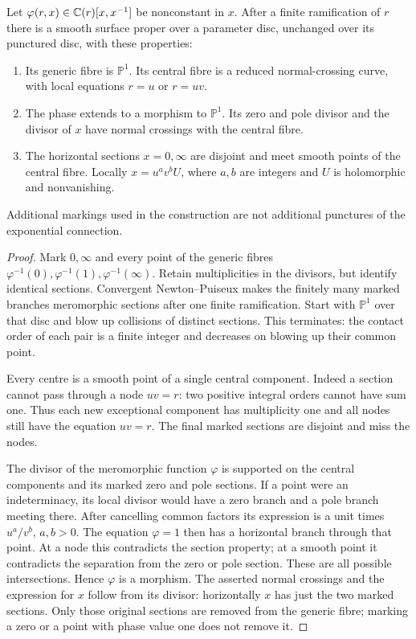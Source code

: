 \begin{lemma}\label{lem:markedmodel}
Let $\varphi(r,x)\in\mathbb C(r)[x,x^{-1}]$ be nonconstant in $x$.
After a finite ramification of $r$ there is a smooth surface proper
over a parameter disc, unchanged over its punctured disc, with these
properties:
\begin{enumerate}
\item Its generic fibre is $\mathbb P^1$. Its central fibre is a
reduced normal-crossing curve, with local equations $r=u$ or $r=uv$.
\item The phase extends to a morphism to $\mathbb P^1$. Its zero
and pole divisor and the divisor of $x$ have normal crossings with
the central fibre.
\item The horizontal sections $x=0,\infty$ are disjoint and meet
smooth points of the central fibre. Locally $x=u^a v^b U$, where
$a,b$ are integers and $U$ is holomorphic and nonvanishing.
\end{enumerate}
Additional markings used in the construction are not additional
punctures of the exponential connection.
\end{lemma}
\begin{proof}
Mark $0,\infty$ and every point of the generic fibres
$\varphi^{-1}(0),\varphi^{-1}(1),\varphi^{-1}(\infty)$.
Retain multiplicities in the divisors, but identify identical sections.
Convergent Newton--Puiseux makes the finitely many marked branches
meromorphic sections after one finite ramification. Start with
$\mathbb P^1$ over that disc and blow up collisions of distinct
sections. This terminates: the contact order of each pair is a finite
integer and decreases on blowing up their common point.

Every centre is a smooth point of a single central component. Indeed
a section cannot pass through a node $uv=r$: two positive integral
orders cannot have sum one. Thus each new exceptional component has
multiplicity one and all nodes still have the equation $uv=r$.
The final marked sections are disjoint and miss the nodes.

The divisor of the meromorphic function $\varphi$ is supported on
the central components and its marked zero and pole sections. If a
point were an indeterminacy, its local divisor would have a zero
branch and a pole branch meeting there. After cancelling common
factors its expression is a unit times $u^a/v^b$, $a,b>0$.
The equation $\varphi=1$ then has a horizontal branch through that
point. At a node this contradicts the section property; at a smooth
point it contradicts the separation from the zero or pole section.
These are all possible intersections. Hence $\varphi$ is a morphism.
The asserted normal crossings and the expression for $x$ follow
from its divisor: horizontally $x$ has just the two marked sections.
Only those original sections are removed from the generic fibre;
marking a zero or a point with phase value one does not remove it.
\end{proof}

